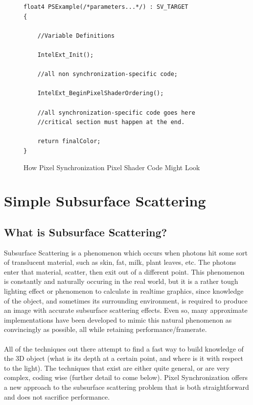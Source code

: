 \documentclass[a4paper, 12pt]{article}
\begin{document}
\begin{figure}[h]
\begin{lstlisting}[language=HLSL]
float4 PSExample(/*parameters...*/) : SV_TARGET
{

	//Variable Definitions

	IntelExt_Init();
	
	//all non synchronization-specific code;

	IntelExt_BeginPixelShaderOrdering();

	//all synchronization-specific code goes here
	//critical section must happen at the end.

	return finalColor;
}

\end{lstlisting}
\caption{How Pixel Synchronization Pixel Shader Code Might Look}
\label{code:PSExample}
\end{figure}

\pagebreak


\section{Simple Subsurface Scattering}

\subsection{What is Subsurface Scattering?}

Subsurface Scattering is a phenomenon which occurs when photons hit some sort
of translucent material, such as skin, fat, milk, plant leaves, etc. The
photons enter that material, scatter, then exit out of a different point. This
phenomenon is constantly and naturally occuring in the real world, but it is a
rather tough lighting effect or phenomenon to calculate in realtime graphics,
since knowledge of the object, and sometimes its surrounding environment, is
required to produce an image with accurate subsurface scattering effects. Even
so, many approximate implementations have been developed to mimic this natural
phenomenon as convincingly as possible, all while retaining
performance/framerate. \\ \\ All of the techniques out there attempt to find a
fast way to build knowledge of the 3D object (what is its depth at a certain
point, and where is it with respect to the light). The techniques that exist
are either quite general, or are very complex, coding wise (further detail to
come below). Pixel Synchronization offers a new approach to the subsurface
scattering problem that is both straightforward and does not sacrifice
performance.
\end{document}

